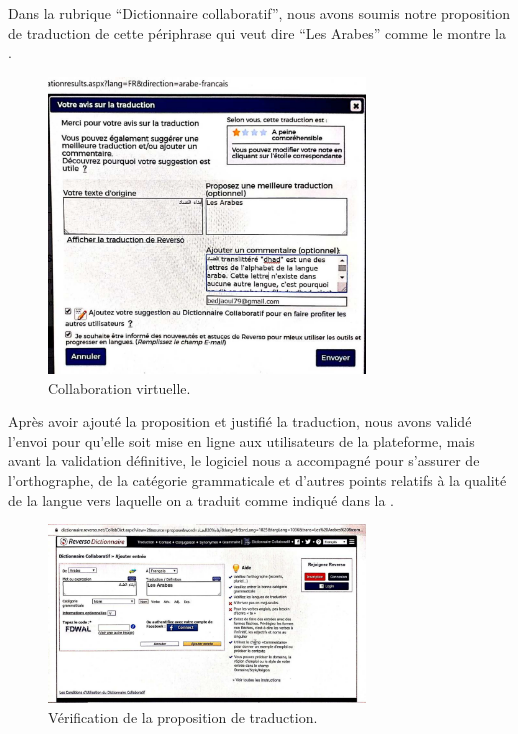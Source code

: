 \documentclass[french]{textolivre}
\begin{document}
Dans la rubrique “Dictionnaire collaboratif”, nous avons soumis notre proposition de traduction de cette périphrase qui veut dire “Les Arabes” comme le montre la .

\begin{figure}[htbp]
 \centering
 \includegraphics[width=0.75\textwidth]{figure06.pdf}
 \caption{Collaboration virtuelle.}
 \label{fig-06}
\end{figure}

Après avoir ajouté la proposition et justifié la traduction, nous avons validé l’envoi pour qu’elle soit mise en ligne aux utilisateurs de la plateforme, mais avant la validation définitive, le logiciel nous a accompagné pour s’assurer de l’orthographe, de la catégorie grammaticale et d’autres points relatifs à la qualité de la langue vers laquelle on a traduit comme indiqué dans la . 

\begin{figure}[htbp]
 \centering
 \includegraphics[width=0.75\textwidth]{figure07.pdf}
 \caption{Vérification de la proposition de traduction.}
 \label{fig-07}
\end{figure}
\end{document}
